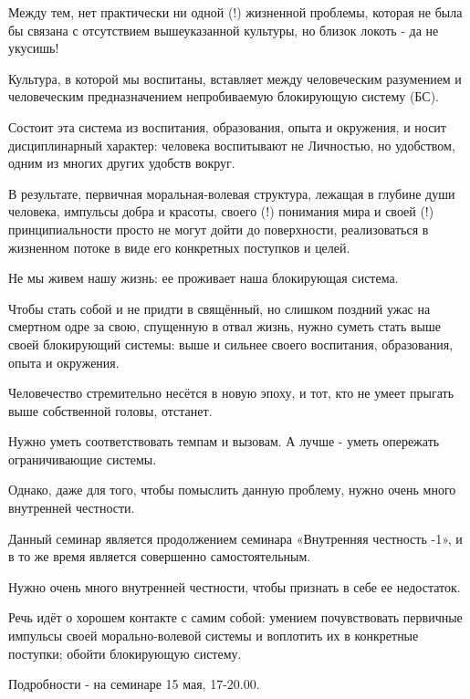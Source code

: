 Между тем, нет практически ни одной (!) жизненной проблемы, которая не была бы
связана с отсутствием вышеуказанной культуры, но близок локоть - да не укусишь!

Культура, в которой мы воспитаны, вставляет между человеческим разумением и
человеческим предназначением непробиваемую блокирующую систему (БС).

Состоит эта система из воспитания, образования, опыта и окружения, и носит
дисциплинарный характер: человека воспитывают не Личностью, но удобством, одним
из многих других удобств вокруг.

В результате, первичная моральная-волевая структура, лежащая в глубине души
человека, импульсы добра и красоты, своего (!) понимания мира и своей (!)
принципиальности просто не могут дойти до поверхности, реализоваться в
жизненном потоке в виде его конкретных поступков и целей.

Не мы живем нашу жизнь: ее проживает наша блокирующая система.

Чтобы стать собой и не придти в свящённый, но слишком поздний ужас на смертном
одре за свою, спущенную в отвал жизнь, нужно суметь стать выше своей
блокирующий системы: выше и сильнее своего воспитания, образования, опыта и
окружения.

Человечество стремительно несётся в новую эпоху, и тот, кто не умеет прыгать выше собственной головы, отстанет.

Нужно уметь соответствовать темпам и вызовам. А лучше - уметь опережать ограничивающие системы. 

Однако, даже для того, чтобы помыслить данную проблему, нужно очень много
внутренней честности.

Данный семинар является продолжением семинара «Внутренняя честность -1», и в то
же время является совершенно самостоятельным.

Нужно очень много внутренней честности, чтобы признать в себе ее недостаток. 

Речь идёт о хорошем контакте с самим собой: умением почувствовать первичные
импульсы своей морально-волевой системы и воплотить их в конкретные поступки;
обойти блокирующую систему.

Подробности - на семинаре 15 мая, 17-20.00.
